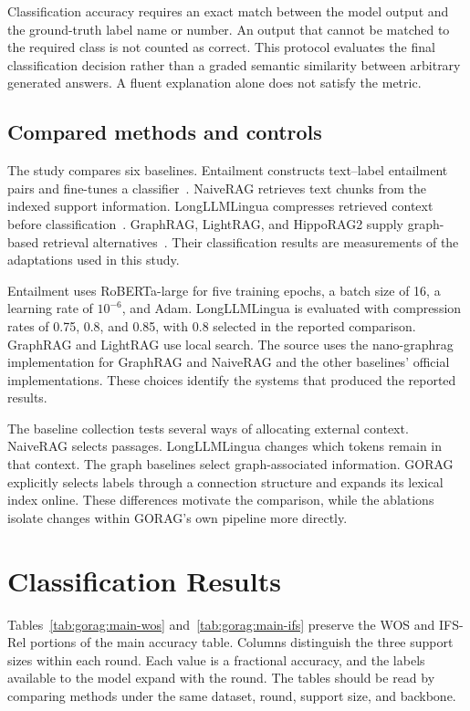 Classification accuracy requires an exact match between the model output and the ground-truth label name or number. An output that cannot be matched to the required class is not counted as correct. This protocol evaluates the final classification decision rather than a graded semantic similarity between arbitrary generated answers. A fluent explanation alone does not satisfy the metric.

\subsection{Compared methods and controls}
\label{sec:gorag:baselines}

The study compares six baselines. Entailment constructs text--label entailment pairs and fine-tunes a classifier~\cite{gorag-xia-etal-2021-incremental}. NaiveRAG retrieves text chunks from the indexed support information. LongLLMLingua compresses retrieved context before classification~\cite{gorag-jiang-etal-2024-longllmlingua}. GraphRAG, LightRAG, and HippoRAG2 supply graph-based retrieval alternatives~\cite{gorag-edge2024local,gorag-guo2024lightrag,gorag-gutierrez2025memory}. Their classification results are measurements of the adaptations used in this study.

Entailment uses RoBERTa-large for five training epochs, a batch size of 16, a learning rate of $10^{-6}$, and Adam. LongLLMLingua is evaluated with compression rates of 0.75, 0.8, and 0.85, with 0.8 selected in the reported comparison. GraphRAG and LightRAG use local search. The source uses the nano-graphrag implementation for GraphRAG and NaiveRAG and the other baselines' official implementations. These choices identify the systems that produced the reported results.

The baseline collection tests several ways of allocating external context. NaiveRAG selects passages. LongLLMLingua changes which tokens remain in that context. The graph baselines select graph-associated information. GORAG explicitly selects labels through a connection structure and expands its lexical index online. These differences motivate the comparison, while the ablations isolate changes within GORAG's own pipeline more directly.

\section{Classification Results}
\label{sec:gorag:results}

Tables~\ref{tab:gorag:main-wos} and~\ref{tab:gorag:main-ifs} preserve the WOS and IFS-Rel portions of the main accuracy table. Columns distinguish the three support sizes within each round. Each value is a fractional accuracy, and the labels available to the model expand with the round. The tables should be read by comparing methods under the same dataset, round, support size, and backbone.

